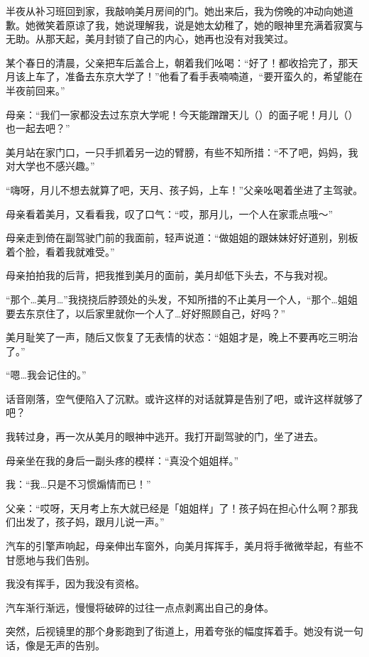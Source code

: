 半夜从补习班回到家，我敲响美月房间的门。她出来后，我为傍晚的冲动向她道歉。她微笑着原谅了我，她说理解我，说是她太幼稚了，她的眼神里充满着寂寞与无助。从那天起，美月封锁了自己的内心，她再也没有对我笑过。

\cutlinesma

\newday{\hate\cloudy}

某个春日的清晨，父亲把车后盖合上，朝着我们吆喝：“好了！都收拾完了，那天月该上车了，准备去东京大学了！”他看了看手表喃喃道，“要开蛮久的，希望能在半夜前回来。”

母亲：“我们一家都没去过东京大学呢！今天能蹭蹭天儿（）的面子呢！月儿（）也一起去吧？”

美月站在家门口，一只手抓着另一边的臂膀，有些不知所措：“不了吧，妈妈，我对大学也不感兴趣。”

“嗨呀，月儿不想去就算了吧，天月、孩子妈，上车！”父亲吆喝着坐进了主驾驶。

母亲看着美月，又看看我，叹了口气：“哎，那月儿，一个人在家乖点哦～”

母亲走到倚在副驾驶门前的我面前，轻声说道：“做姐姐的跟妹妹好好道别，别板着个脸，看着我就难受。”

母亲拍拍我的后背，把我推到美月的面前，美月却低下头去，不与我对视。

“那个…美月…”我挠挠后脖颈处的头发，不知所措的不止美月一个人，“那个…姐姐要去东京住了，以后家里就你一个人了…好好照顾自己，好吗？”

美月耻笑了一声，随后又恢复了无表情的状态：“姐姐才是，晚上不要再吃三明治了。”

“嗯…我会记住的。”

话音刚落，空气便陷入了沉默。或许这样的对话就算是告别了吧，或许这样就够了吧？

我转过身，再一次从美月的眼神中逃开。我打开副驾驶的门，坐了进去。

母亲坐在我的身后一副头疼的模样：“真没个姐姐样。”

我：“我…只是不习惯煽情而已！”

父亲：“哎呀，天月考上东大就已经是「姐姐样」了！孩子妈在担心什么啊？那我们出发了，孩子妈，跟月儿说一声。”

汽车的引擎声响起，母亲伸出车窗外，向美月挥挥手，美月将手微微举起，有些不甘愿地与我们告别。

我没有挥手，因为我没有资格。

汽车渐行渐远，慢慢将破碎的过往一点点剥离出自己的身体。

突然，后视镜里的那个身影跑到了街道上，用着夸张的幅度挥着手。她没有说一句话，像是无声的告别。

